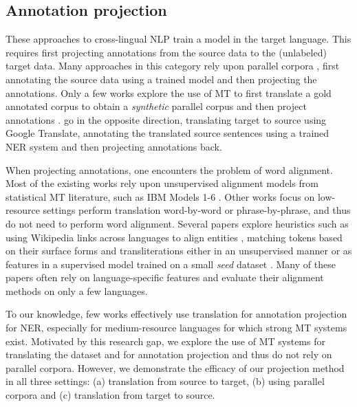 \documentclass[11pt,a4paper]{article}
\begin{document}
\subsection{Annotation projection}
These approaches to cross-lingual NLP 
train a model in the target language.
This requires first projecting annotations 
from the source data to the (unlabeled) target data. 
Many approaches in this category rely upon parallel corpora 
\cite{yarowsky2001inducing, hwa2005bootstrapping, zeman2008cross, ehrmann2011building, fu2011generating, ni2017weakly},
first annotating the source data using a trained model 
and then projecting the annotations. 
Only a few works explore the use of MT 
to first translate a gold annotated corpus 
to obtain a \emph{synthetic} parallel corpus 
and then project annotations \citep{tiedemann2014treebank}. 
\citet{shah2010synergy} go in the opposite direction, 
translating target to source using Google Translate, 
annotating the translated source sentences 
using a trained NER system and then projecting annotations back.

When projecting annotations, one encounters the problem of word alignment. 
Most of the existing works \citep{yarowsky2001inducing, shah2010synergy, ni2017weakly} 
rely upon unsupervised alignment models from statistical MT literature, 
such as IBM Models 1-6 \cite{brown1993mathematics, och2003systematic}. 
Other works focus on low-resource settings \citep{mayhew2017cheap, xie2018neural} 
perform translation word-by-word or phrase-by-phrase, 
and thus do not need to perform word alignment. 
Several papers explore heuristics such as using Wikipedia links across languages 
to align entities \citep{richman2008mining, nothman2013learning, al2015polyglot}, 
matching tokens based on their surface forms 
and transliterations either in an unsupervised manner \cite{samy2005proposal, ehrmann2011building}
or as features in a supervised model trained 
on a small \emph{seed} dataset \cite{feng2004new}. 
Many of these papers often rely on language-specific features \cite{feng2004new}
and evaluate their alignment methods on only a few languages.


To our knowledge, few works effectively use translation
for annotation projection for NER, 
especially for medium-resource languages 
for which strong MT systems exist.
Motivated by this research gap, we explore the use of MT systems 
for translating the dataset and for annotation projection 
and thus do not rely on parallel corpora. 
However, we demonstrate the efficacy of our projection method in all three settings:
(a) translation from source to target,
(b) using parallel corpora and 
(c) translation from target to source.
\end{document}
